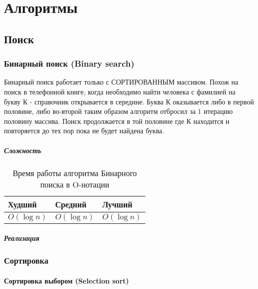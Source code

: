 \part{Алгоритмы}

\chapter{Поиск}
		
\section{Бинарный поиск (Binary search) \label{search:binary}}

Бинарный поиск работает только с СОРТИРОВАННЫМ массивом. Похож на поиск в телефонной книге, когда необходимо найти человека с фамилией на букву К - справочник открывается в середине. Буква К оказывается либо в первой половине, либо во-второй таким образом алгоритм отбросил за 1 итерацию половину массива.
Поиск продолжается в той половине где К находится и повторяется до тех пор пока не будет найдена буква.

\subsubsection{Сложность}
\begin{table}[h!]
\caption{Время работы алгоритма Бинарного поиска в O-нотации}
\begin{tabular}{|l|l|l|}
\hline
Худший & Средний & Лучший \\ \hline
$ O(\log n) $ & $ O(\log n) $ & $ O(\log n) $ \\\hline
\end{tabular}
\end{table}

		\subsubsection{Реализация}
\linenumbers
{}
\nolinenumbers	
		
	\section{Сортировка}
		\subsection{Сортировка выбором (Selection sort) \label{sort:select}}
		

